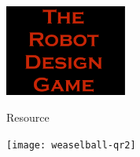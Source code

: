 \documentclass[11pt]{article}
\begin{document}
\color{white}            
    
    \begin{center}
        
        \rule{0pt}{10mm}    


        \includegraphics[trim=5 5 5 5,clip,height=3cm]{rdg_logo}%
        
        \rule{0pt}{5mm}    
        
        

Resource



        \rule{0pt}{5mm}    

        \texttt{[image: weaselball-qr2]}%

        

    \end{center}
\end{document}
